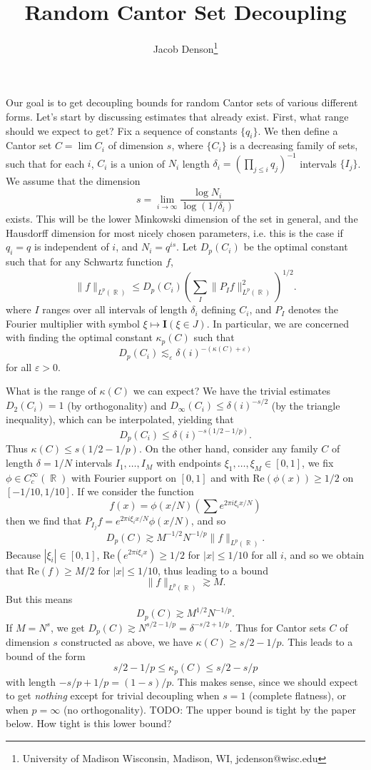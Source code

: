 \documentclass[dvipsnames,letterpaper,12pt]{article}
\title{Random Cantor Set Decoupling}
\author{Jacob Denson\footnote{University of Madison Wisconsin, Madison, WI, jcdenson@wisc.edu}}
\numberwithin{equation}{section}
\DeclareMathOperator{\RR}{\mathbb{R}}
\numberwithin{theorem}{section}
\begin{document}
\maketitle

Our goal is to get decoupling bounds for random Cantor sets of various different forms. Let's start by discussing estimates that already exist. First, what range should we expect to get? Fix a sequence of constants $\{ q_i \}$. We then define a Cantor set $C = \lim C_i$ of dimension $s$, where $\{ C_i \}$ is a decreasing family of sets, such that for each $i$, $C_i$ is a union of $N_i$ length $\delta_i = ( \prod_{j \leq i} q_j )^{-1}$ intervals $\{ I_j \}$. We assume that the dimension
%
\[ s = \lim_{i \to \infty} \frac{\log N_i}{\log(1/\delta_i)} \]
%
exists. This will be the lower Minkowski dimension of the set in general, and the Hausdorff dimension for most nicely chosen parameters, i.e. this is the case if $q_i = q$ is independent of $i$, and $N_i = q^{is}$. Let $D_p(C_i)$ be the optimal constant such that for any Schwartz function $f$,
%
\[ \| f \|_{L^p(\RR)} \leq D_p(C_i) \left( \sum_I \| P_I f \|_{L^p(\RR)}^2 \right)^{1/2}. \]
%
where $I$ ranges over all intervals of length $\delta_i$ defining $C_i$, and $P_I$ denotes the Fourier multiplier with symbol $\xi \mapsto \mathbf{I}(\xi \in J)$. In particular, we are concerned with finding the optimal constant $\kappa_p(C)$ such that
%
\[ D_p(C_i) \lesssim_\varepsilon \delta(i)^{- (\kappa(C) + \varepsilon)} \]
%
for all $\varepsilon > 0$.

What is the range of $\kappa(C)$ we can expect? We have the trivial estimates $D_2(C_i) = 1$ (by orthogonality) and $D_\infty(C_i) \leq \delta(i)^{-s/2}$ (by the triangle inequality), which can be interpolated, yielding that
%
\[ D_p(C_i) \leq \delta(i)^{-s(1/2-1/p)}. \]
%
Thus $\kappa(C) \leq s(1/2 - 1/p)$. On the other hand, consider any family $C$ of length $\delta = 1/N$ intervals $I_1,\dots,I_M$ with endpoints $\xi_1, \dots, \xi_M \in [0,1]$, we fix $\phi \in C_c^\infty(\RR)$ with Fourier support on $[0,1]$ and with $\text{Re}(\phi(x)) \geq 1/2$ on $[-1/10,1/10]$. If we consider the function
%
\[ f(x) = \phi(x/N) \left( \sum e^{2 \pi i \xi_i x / N} \right) \]
%
then we find that $P_{I_j} f = e^{2 \pi i \xi_i x / N} \phi(x/N)$, and so
%
\[ D_p(C) \gtrsim M^{-1/2} N^{-1/p} \| f \|_{L^p(\RR)}. \]
%
Because $|\xi_i| \in [0,1]$, $\text{Re}(e^{2 \pi i \xi_i x}) \geq 1/2$ for $|x| \leq 1/10$ for all $i$, and so we obtain that $\text{Re}(f) \geq M/2$ for $|x| \leq 1/10$, thus leading to a bound
%
\[ \| f \|_{L^p(\RR)} \gtrsim M. \]
%
But this means
%
\[ D_p(C) \gtrsim M^{1/2} N^{-1/p}. \]
%
If $M = N^s$, we get $D_p(C) \gtrsim N^{s/2 - 1/p} = \delta^{-s/2 + 1/p}$. Thus for Cantor sets $C$ of dimension $s$ constructed as above, we have $\kappa(C) \geq s/2 - 1/p$. This leads to a bound of the form
%
\[ s/2 - 1/p \leq \kappa_p(C) \leq s/2 - s/p \]
%
with length $-s/p + 1/p = (1 - s) / p$. This makes sense, since we should expect to get \emph{nothing} except for trivial decoupling when $s = 1$ (complete flatness), or when $p = \infty$ (no orthogonality). TODO: The upper bound is tight by the paper below. How tight is this lower bound?
\end{document}
